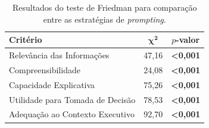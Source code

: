\begin{table}[ht]
\centering
\caption{Resultados do teste de Friedman para comparação entre as estratégias de \textit{prompting}.}
\label{tab:friedman}
\small
\begin{tabular}{lcc}
\hline
\textbf{Critério} & $\boldsymbol{\chi^2}$ & \textbf{$p$-valor} \\
\hline
Relevância das Informações & 47,16 & \textbf{<0,001} \\
Compreensibilidade & 24,08 & \textbf{<0,001} \\
Capacidade Explicativa & 75,26 & \textbf{<0,001} \\
Utilidade para Tomada de Decisão & 78,53 & \textbf{<0,001} \\
Adequação ao Contexto Executivo & 92,70 & \textbf{<0,001} \\
\hline
\end{tabular}
\end{table}
